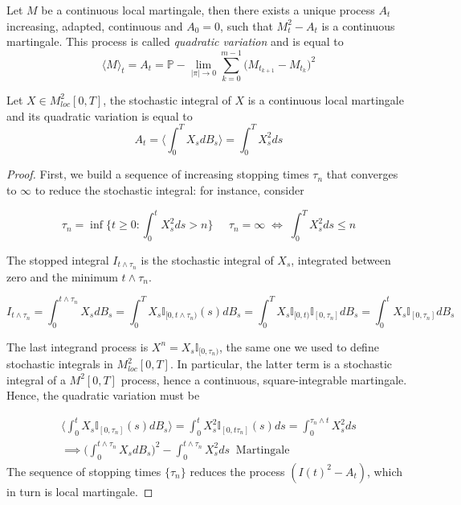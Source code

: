 \begin{proposition}
    Let $M$ be a continuous local martingale, then there exists a unique process $A_t$ increasing, adapted, continuous and $A_0 = 0$, such that $M_t^2 - A_t$ is a continuous martingale. This process is called \textit{quadratic variation} and is equal to 
    \begin{equation}
        \langle M \rangle_t = A_t = \mathbb{P}-\lim_{\vert \pi \vert \to 0} \sum_{k = 0}^{m-1} \big( M_{t_{k+1}} - M_{t_k} \big)^2 
    \end{equation}
\end{proposition}

\begin{proposition}
    Let $X \in M^2_{loc}[0,T]$, the stochastic integral of $X$ is a continuous local martingale and its quadratic variation is equal to 
    \begin{equation}
        A_t = \Big\langle \int_0^T X_s dB_s \Big\rangle = \int_0^T X_s^2 ds  
    \end{equation}
\end{proposition}
\begin{proof}
    First, we build a sequence of increasing stopping times $\tau_n$ that converges to $\infty$ to reduce the stochastic integral: for instance, consider 

    \begin{equation*}
        \tau_n = \inf \Big\{ t \geq 0 : \int_0^t X_s^2 ds > n \Big\} \;\;\;\;\; \tau_n = \infty \;\iff\; \int_0^T X_s^2 ds \leq n 
    \end{equation*}

    The stopped integral $I_{t \wedge \tau_n}$ is the stochastic integral of $X_s$, integrated between zero and the minimum $t \wedge \tau_n$. 

    \begin{equation*}
        I_{t \wedge \tau_n} = \int_0^{t \wedge \tau_n} X_s dB_s = \int_0^T X_s \mathbb{I}_{[0,t \wedge \tau_n)}(s) dB_s = \int_0^T X_s \mathbb{I}_{[0,t)} \mathbb{I}_{[0,\tau_n]} dB_s = \int_0^t X_s \mathbb{I}_{[0,\tau_n]} dB_s
    \end{equation*}

    The last integrand process is $X^n = X_s \mathbb{I}_{[0,\tau_n)}$, the same one we used to define stochastic integrals in $M^2_{loc}[0,T]$. In particular, the latter term is a stochastic integral of a $M^2[0,T]$ process, hence a continuous, square-integrable martingale. Hence, the quadratic variation must be

    \begin{gather*}
        \Big\langle \int_0^t X_s \mathbb{I}_{[0,\tau_n]}(s) dB_s \Big\rangle = \int_0^t X_s^2 \mathbb{I}_{[0,t\tau_n]}(s) ds = \int_0^{\tau_n \wedge t} X_s^2 ds \\
        \implies \Bigg( \int_0^{t \wedge \tau_n} X_s dB_s \Bigg)^2 - \int_0^{t \wedge \tau_n} X_s^2 ds \;\; \text{Martingale}
    \end{gather*}
    The sequence of stopping times $\{\tau_n\}$ reduces the process $(I(t)^2-A_t)$, which in turn is local martingale. 
\end{proof}

